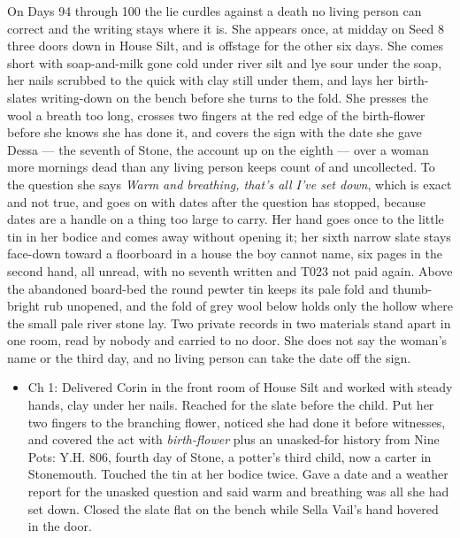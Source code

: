 \documentclass{design/chronicle}
\begin{document}
{On Days 94 through 100 the lie curdles against a death no living person can correct and the writing stays where it is. She appears once, at midday on Seed 8 three doors down in House Silt, and is offstage for the other six days. She comes short with soap-and-milk gone cold under river silt and lye sour under the soap, her nails scrubbed to the quick with clay still under them, and lays her birth-slates writing-down on the bench before she turns to the fold. She presses the wool a breath too long, crosses two fingers at the red edge of the birth-flower before she knows she has done it, and covers the sign with the date she gave Dessa --- the seventh of Stone, the account up on the eighth --- over a woman more mornings dead than any living person keeps count of and uncollected. To the question she says \emph{Warm and breathing, that’s all I’ve set down}, which is exact and not true, and goes on with dates after the question has stopped, because dates are a handle on a thing too large to carry. Her hand goes once to the little tin in her bodice and comes away without opening it; her sixth narrow slate stays face-down toward a floorboard in a house the boy cannot name, six pages in the second hand, all unread, with no seventh written and T023 not paid again. Above the abandoned board-bed the round pewter tin keeps its pale fold and thumb-bright rub unopened, and the fold of grey wool below holds only the hollow where the small pale river stone lay. Two private records in two materials stand apart in one room, read by nobody and carried to no door. She does not say the woman’s name or the third day, and no living person can take the date off the sign.

\begin{itemize}[leftmargin=1.4em,itemsep=1pt,topsep=3pt,parsep=0pt]

\item Ch 1: Delivered Corin in the front room of House Silt and worked with steady hands, clay under her nails. Reached for the slate before the child. Put her two fingers to the branching flower, noticed she had done it before witnesses, and covered the act with \emph{birth-flower} plus an unasked-for history from Nine Pots: Y.H. 806, fourth day of Stone, a potter’s third child, now a carter in Stonemouth. Touched the tin at her bodice twice. Gave a date and a weather report for the unasked question and said warm and breathing was all she had set down. Closed the slate flat on the bench while Sella Vail’s hand hovered in the door.


\end{itemize}}
\end{document}
